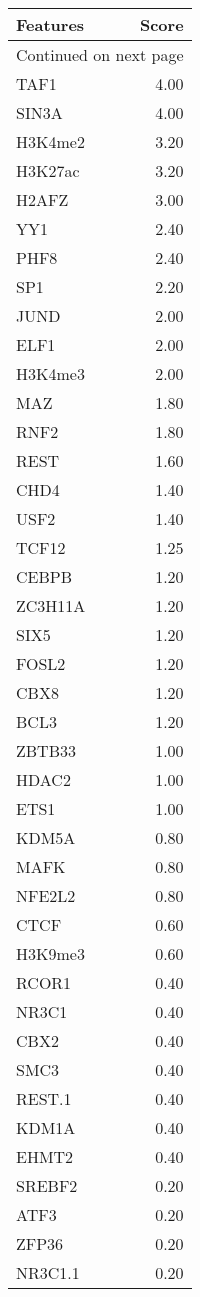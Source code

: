\begin{longtable}{lr}
\caption{}\\
\toprule
Features &  Score \\
\midrule
\endhead
\midrule
\multicolumn{2}{r}{{Continued on next page}} \\
\midrule
\endfoot

\bottomrule
\endlastfoot
    TAF1 &   4.00 \\
   SIN3A &   4.00 \\
 H3K4me2 &   3.20 \\
 H3K27ac &   3.20 \\
   H2AFZ &   3.00 \\
     YY1 &   2.40 \\
    PHF8 &   2.40 \\
     SP1 &   2.20 \\
    JUND &   2.00 \\
    ELF1 &   2.00 \\
 H3K4me3 &   2.00 \\
     MAZ &   1.80 \\
    RNF2 &   1.80 \\
    REST &   1.60 \\
    CHD4 &   1.40 \\
    USF2 &   1.40 \\
   TCF12 &   1.25 \\
   CEBPB &   1.20 \\
 ZC3H11A &   1.20 \\
    SIX5 &   1.20 \\
   FOSL2 &   1.20 \\
    CBX8 &   1.20 \\
    BCL3 &   1.20 \\
  ZBTB33 &   1.00 \\
   HDAC2 &   1.00 \\
    ETS1 &   1.00 \\
   KDM5A &   0.80 \\
    MAFK &   0.80 \\
  NFE2L2 &   0.80 \\
    CTCF &   0.60 \\
 H3K9me3 &   0.60 \\
   RCOR1 &   0.40 \\
   NR3C1 &   0.40 \\
    CBX2 &   0.40 \\
    SMC3 &   0.40 \\
  REST.1 &   0.40 \\
   KDM1A &   0.40 \\
   EHMT2 &   0.40 \\
  SREBF2 &   0.20 \\
    ATF3 &   0.20 \\
   ZFP36 &   0.20 \\
 NR3C1.1 &   0.20 \\
\end{longtable}

